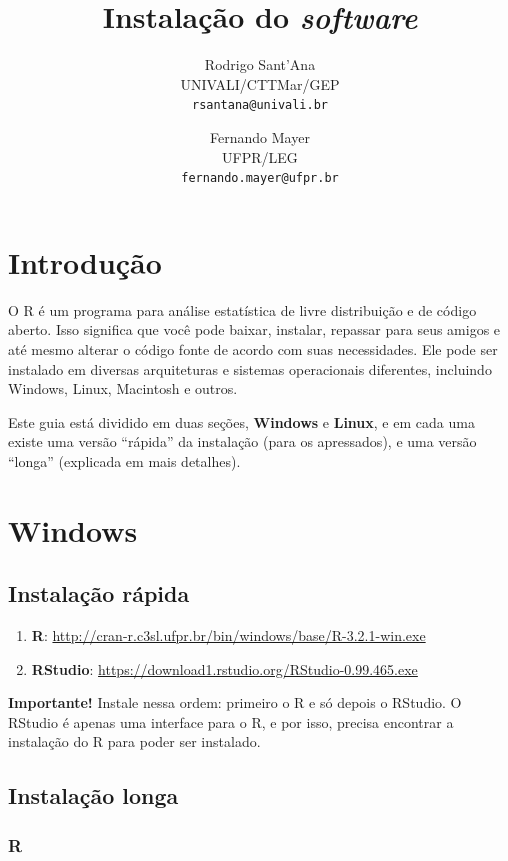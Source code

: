 \documentclass[a4paper,12pt]{article}\usepackage[]{graphicx}\usepackage[]{color}
\title{Instalação do \textit{software} \R}
\author{Rodrigo Sant'Ana \\
  UNIVALI/CTTMar/GEP \\
  \texttt{rsantana@univali.br} \and Fernando Mayer \\
  UFPR/LEG \\
  \texttt{fernando.mayer@ufpr.br}}
\date{}
\providecommand{\R}{\textsf{R}\xspace}
\providecommand{\RStudio}{\textsf{RStudio}\xspace}
\begin{document}
\maketitle
\tableofcontents

\section{Introdução}

O \R é um programa para análise estatística de livre distribuição e de
código aberto. Isso significa que você pode baixar, instalar, repassar
para seus amigos e até mesmo alterar o código fonte de acordo com suas
necessidades. Ele pode ser instalado em diversas arquiteturas e sistemas
operacionais diferentes, incluindo Windows, Linux, Macintosh e
outros.

Este guia está dividido em duas seções, \textbf{Windows} e
\textbf{Linux}, e em cada uma existe uma versão ``rápida'' da instalação
(para os apressados), e uma versão ``longa'' (explicada em mais
detalhes).

\section{Windows}

\subsection{Instalação rápida}

\begin{enumerate}
\item \textbf{\R}:
  \url{http://cran-r.c3sl.ufpr.br/bin/windows/base/R-3.2.1-win.exe}
\item \textbf{\RStudio}:
  \url{https://download1.rstudio.org/RStudio-0.99.465.exe}
\end{enumerate}

\textbf{Importante!} Instale nessa ordem: primeiro o \R e só depois o
\RStudio. O \RStudio é apenas uma interface para o \R, e por isso,
precisa encontrar a instalação do \R para poder ser instalado.

\subsection{Instalação longa}

\subsubsection{\R}
\end{document}
